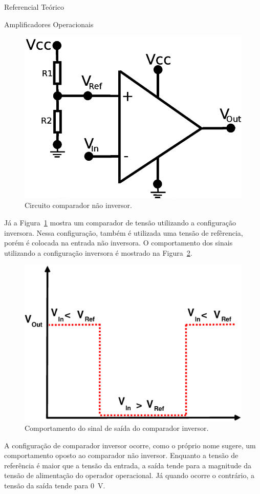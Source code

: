 \begin{chapter}{Referencial Teórico}
\begin{section}{Amplificadores Operacionais}
\begin{figure}[!h]
	\centering
	\begin{minipage}[c]{\textwidth}
	\centering
	\includegraphics[width=0.5\linewidth]{fig/inversor}
	\caption{Circuito comparador não inversor.}
	\label{fig:comparador2}
	\end{minipage}
\end{figure}
\break
Já a Figura~\ref{fig:comparador2} mostra um comparador de tensão utilizando a
configuração inversora. Nessa configuração, também é utilizada uma tensão de
refêrencia, porém é colocada na entrada não inversora. O comportamento dos sinais
utilizando a configuração inversora é mostrado na Figura~\ref{fig:sinal2}. 


\begin{figure}[!h]
	\centering
	\begin{minipage}[c]{\textwidth}
	\centering
	\includegraphics[width=0.55\linewidth]{fig/comparador_inversor}
	\caption{Comportamento do sinal de saída do comparador inversor.}
	\label{fig:sinal2}
	\end{minipage}
\end{figure}

A configuração de comparador inversor ocorre, como o próprio nome sugere, um
comportamento oposto ao comparador não inversor. Enquanto a tensão de referência
é maior que a tensão da entrada, a saída tende para a magnitude da tensão de
alimentação do operador operacional. Já quando ocorre o contrário,  a tensão da
saída tende para 0~V.


\end{section}
\end{chapter}

